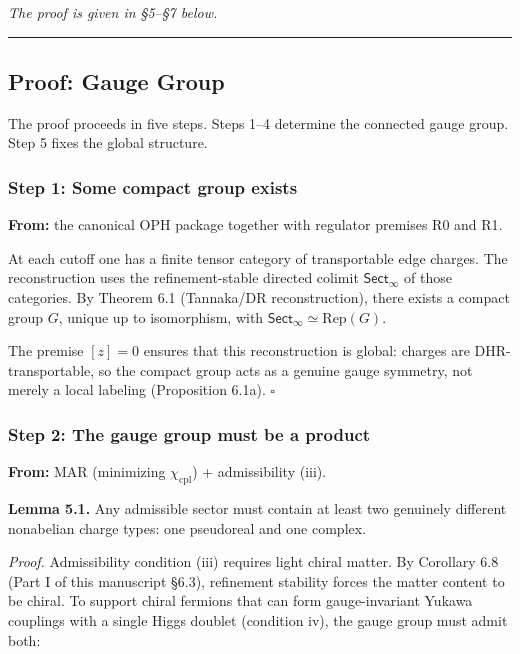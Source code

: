 \emph{The proof is given in \S{}5--\S{}7 below.}

\begin{center}\rule{0.5\linewidth}{0.5pt}\end{center}

\subsection{Proof: Gauge Group}\label{5-proof-gauge-group}

The proof proceeds in five steps. Steps 1--4 determine the connected gauge group. Step 5 fixes the global structure.

\subsubsection{Step 1: Some compact group exists}\label{step-1-some-compact-group-exists}

\textbf{From:} the canonical OPH package together with regulator premises R0 and R1.

At each cutoff one has a finite tensor category of transportable edge charges. The reconstruction uses the refinement-stable directed colimit \(\mathsf{Sect}_\infty\) of those categories. By Theorem 6.1 (Tannaka/DR reconstruction), there exists a compact group \(G\), unique up to isomorphism, with \(\mathsf{Sect}_\infty \simeq \mathrm{Rep}(G)\).

The premise \([z] = 0\) ensures that this reconstruction is global: charges are DHR-transportable, so the compact group acts as a genuine gauge symmetry, not merely a local labeling (Proposition 6.1a). \(\square\)

\subsubsection{Step 2: The gauge group must be a product}\label{step-2-the-gauge-group-must-be-a-product}

\textbf{From:} MAR (minimizing \(\chi_{\mathrm{cpl}}\)) + admissibility (iii).

\textbf{Lemma 5.1.} Any admissible sector must contain at least two genuinely different nonabelian charge types: one pseudoreal and one complex.

\emph{Proof.} Admissibility condition (iii) requires light chiral matter. By Corollary 6.8 (Part I of this manuscript \S{}6.3), refinement stability forces the matter content to be chiral. To support chiral fermions that can form gauge-invariant Yukawa couplings with a single Higgs doublet (condition iv), the gauge group must admit both:

